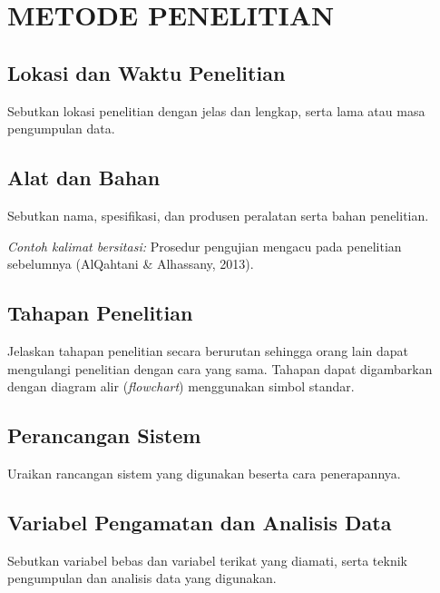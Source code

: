 \chapter{METODE PENELITIAN}

\section{Lokasi dan Waktu Penelitian}
Sebutkan lokasi penelitian dengan jelas dan lengkap, serta lama atau masa pengumpulan data.

\section{Alat dan Bahan}
Sebutkan nama, spesifikasi, dan produsen peralatan serta bahan penelitian.

\textit{Contoh kalimat bersitasi:} Prosedur pengujian mengacu pada penelitian sebelumnya (AlQahtani \& Alhassany, 2013).

\section{Tahapan Penelitian}
Jelaskan tahapan penelitian secara berurutan sehingga orang lain dapat mengulangi penelitian dengan cara yang sama. Tahapan dapat digambarkan dengan diagram alir (\textit{flowchart}) menggunakan simbol standar.

\section{Perancangan Sistem}
Uraikan rancangan sistem yang digunakan beserta cara penerapannya.

\section{Variabel Pengamatan dan Analisis Data}
Sebutkan variabel bebas dan variabel terikat yang diamati, serta teknik pengumpulan dan analisis data yang digunakan.

